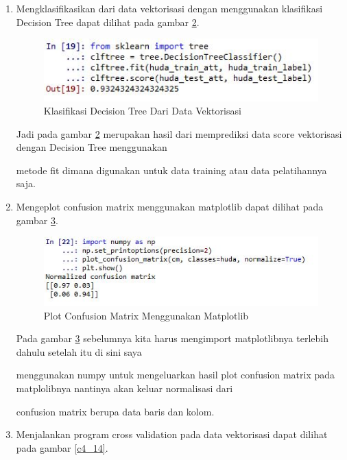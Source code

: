 \begin{enumerate}
\begin{figure}[!htbp]
	\caption{Klasifikasi SVM Dari Data Vektorisasi}
	\label{c4_11}
\end{figure}
\subitem Jadi pada gambar \ref{c4_11} merupakan hasil dari memprediksi data score vektorisasi dengan svm menggunakan metode \par fit dimana digunakan untuk data training atau data pelatihannya saja.
\item Mengklasifikasikan dari data vektorisasi dengan menggunakan klasifikasi Decision Tree dapat dilihat pada gambar \ref{c4_12}.
\begin{figure}[!htbp]
	\centerline{\includegraphics[width=1\textwidth]{figures/huda/chapter4/12.JPG}}
	\caption{Klasifikasi Decision Tree Dari Data Vektorisasi}
	\label{c4_12}
\end{figure}
\subitem Jadi pada gambar \ref{c4_12} merupakan hasil dari memprediksi data score vektorisasi dengan Decision Tree menggunakan \par metode fit dimana digunakan untuk data training atau data pelatihannya saja.
\item Mengeplot confusion matrix menggunakan matplotlib dapat dilihat pada gambar \ref{c4_13}.
\begin{figure}[!htbp]
	\centerline{\includegraphics[width=1\textwidth]{figures/huda/chapter4/13.JPG}}
	\caption{Plot Confusion Matrix Menggunakan Matplotlib}
	\label{c4_13}
\end{figure}
\subitem Pada gambar \ref{c4_13} sebelumnya kita harus mengimport matplotlibnya terlebih dahulu setelah itu di sini saya 
\par menggunakan numpy untuk mengeluarkan hasil plot confusion matrix pada matplolibnya nantinya akan keluar normalisasi dari \par confusion matrix berupa data baris dan kolom. 
\item Menjalankan program cross validation pada data vektorisasi dapat dilihat pada gambar \ref{c4_14}.

\end{enumerate}
